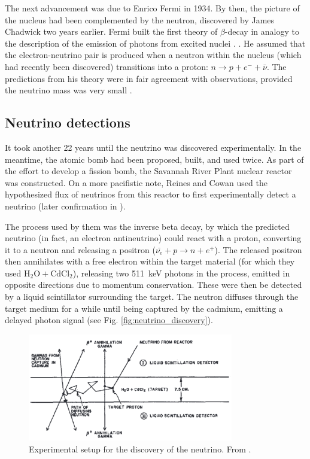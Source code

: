 \documentclass[
    a4paper, %
    fontsize=10pt, %
    twoside=false, %
    numbers=noenddot, %
    fontmethod=tex,
]{kaobook}
\begin{document}
The next advancement was due to Enrico Fermi in 1934. By then, the picture of the nucleus had been complemented by the neutron, discovered by James Chadwick two years earlier. Fermi built the first theory of $\beta$-decay in analogy to the description of the emission of photons from excited nuclei \cite{Fermi1934}. . He assumed that the electron-neutrino pair is produced when a neutron within the nucleus (which had recently been discovered) transitions into a proton: $n \rightarrow p + e^- + \bar{\nu}$. The predictions from his theory were in fair agreement with observations, provided the neutrino mass was very small \cite{Fermi1934}.

\subsection{Neutrino detections}
It took another 22 years until the neutrino was discovered experimentally. In the meantime, the atomic bomb had been proposed, built, and used twice. As part of the effort to develop a fission bomb, the Savannah River Plant nuclear reactor was constructed. On a more pacifistic note, Reines and Cowan used the hypothesized flux of neutrinos from this reactor to first experimentally detect a neutrino \cite{Reines1956} (later confirmation in ).

The process used by them was the inverse beta decay, by which the predicted neutrino (in fact, an electron antineutrino) could react with a proton, converting it to a neutron and releasing a positron ($\bar{\nu_e} + p \rightarrow n + e^+$). The released positron then annihilates with a free electron within the target material (for which they used $\text{H}_2\text{O} + \text{CdCl}_2$), releasing two \SI{511}{\kilo\eV} photons in the process, emitted in opposite directions due to momentum conservation. These were then be detected by a liquid scintillator surrounding the target. The neutron diffuses through the target medium for a while until being captured by the cadmium, emitting a delayed photon signal (see Fig. \ref{fig:neutrino_discovery}).

\begin{figure}[htb]
    \includegraphics[width=0.8\textwidth]{theory/neutrino_discovery_principle.png}
    \caption[Neutrino discovery schematic]{Experimental setup for the discovery of the neutrino. From \cite{Reines1956}.}
\end{figure}
\end{document}
